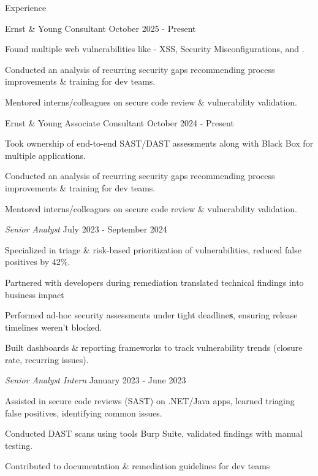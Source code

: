 \documentclass{resume} %
\begin{document}

\begin{rSection}{Experience}
\begin{rSubsection}{Ernst \& Young }{}{Consultant} {\textnormal{October 2025 - Present}}
\item Found multiple web vulnerabilities like - XSS, Security Misconfigurations, and .
\item Conducted an analysis of recurring security gaps recommending process improvements \& training for dev teams. 
\item Mentored interns/colleagues on secure code review \& vulnerability validation.
    
\begin{rSubsection}{Ernst \& Young }{}{Associate Consultant} {\textnormal{October 2024 - Present}}
\item Took ownership of end-to-end SAST/DAST assessments along with Black Box for multiple applications.
\item Conducted an analysis of recurring security gaps recommending process improvements \& training for dev teams. 
\item Mentored interns/colleagues on secure code review \& vulnerability validation.

{\em Senior Analyst}
\hfill{July 2023 - September 2024}
\item Specialized in triage \& risk-based prioritization of vulnerabilities, reduced false positives by 42\%.
\item Partnered with developers during remediation translated technical findings into business impact
\item Performed ad-hoc security assessments under tight deadline\textbf{s}, ensuring release timelines weren’t blocked.
\item Built dashboards \& reporting frameworks to track vulnerability trends (closure rate, recurring issues).

{\em Senior Analyst Intern}
\hfill{ January 2023 - June 2023}
\item Assisted in secure code reviews (SAST) on .NET/Java apps, learned triaging false positives, identifying common issues. 
\item Conducted DAST scans using tools Burp Suite, validated findings with manual testing.
\item Contributed to documentation \& remediation guidelines for dev teams
\end{rSubsection}



\end{rSubsection}
\end{rSection}
\end{document}
